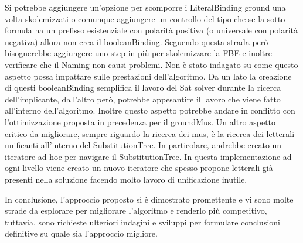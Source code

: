 \documentclass[./main.tex]{subfiles}
\begin{document}
Si potrebbe aggiungere un'opzione per scomporre i LiteralBinding ground una volta skolemizzati 
o comunque aggiungere un controllo del tipo che se la sotto formula ha un prefisso esistenziale con polarità positiva (o universale con polarità negativa) allora non crea il booleanBinding.
Seguendo questa strada però bisognerebbe aggiungere uno step in più per skolemizzare la FBE e 
inoltre verificare che il Naming non causi problemi.
Non è stato indagato su come questo aspetto possa impattare sulle prestazioni dell'algoritmo.
Da un lato la creazione di questi booleanBinding semplifica il lavoro del Sat solver durante la ricerca dell'implicante,
dall'altro però, potrebbe appesantire il lavoro che viene fatto all'interno dell'algoritmo.
Inoltre questo aspetto potrebbe andare in conflitto con l'ottimizzazione proposta in precedenza per il groundMus.
Un altro aspetto critico da migliorare, sempre riguardo la ricerca dei mus, è la ricerca dei letterali unificanti all'interno del SubstitutionTree.
In particolare, andrebbe creato un iteratore ad hoc per navigare il SubstitutionTree.
In questa implementazione ad ogni livello viene creato un nuovo iteratore che spesso propone letterali già presenti nella soluzione
facendo molto lavoro di unificazione inutile.

In conclusione, l'approccio proposto si è dimostrato promettente e vi sono molte strade da esplorare 
per migliorare l'algoritmo e renderlo più competitivo, 
tuttavia, sono richieste ulteriori indagini e sviluppi per formulare conclusioni definitive su quale sia l'approccio migliore.
\end{document}
